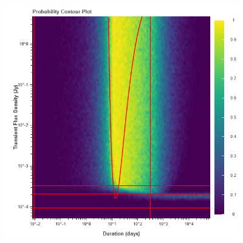 \documentclass{article}
\begin{document}
\begin{figure}[H] 
	\begin{center}
		\includegraphics[width=4in]{output_gaussian_ProbContour.png}
		
		\label{gaussian}
	\end{center}
\end{figure}
\end{document}
